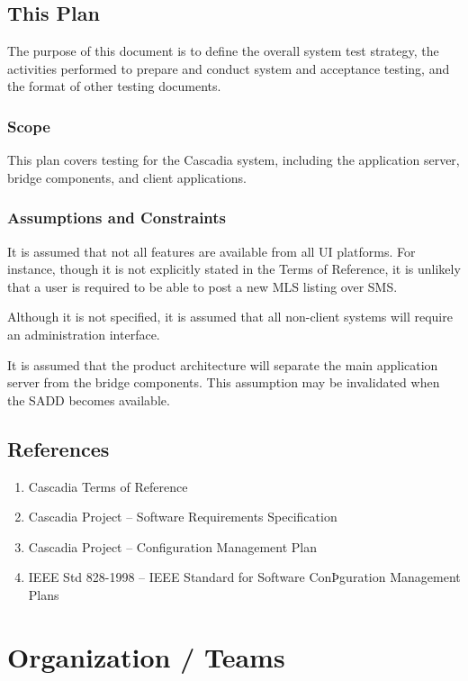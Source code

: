 \documentclass[11pt]{wacomepd}
\begin{document}
\section{This Plan}
The purpose of this document is to define the overall system test strategy, the activities performed
to prepare and conduct system and acceptance testing, and the format of other testing documents.

\subsection{Scope}
This plan covers testing for the Cascadia system, including the application server, bridge
components, and client applications.

\subsection{Assumptions and Constraints}
It is assumed that not all features are available from all UI platforms.  For instance, though it is
not explicitly stated in the Terms of Reference, it is unlikely that a user is required to be able
to post a new MLS listing over SMS.

Although it is not specified, it is assumed that all non-client systems will require an
administration interface.

It is assumed that the product architecture will separate the main application server from the
bridge components.  This assumption may be invalidated when the SADD becomes available.


\section{References}
\begin{enumerate}[(1)]
\item Cascadia Terms of Reference
\item Cascadia Project -- Software Requirements Specification
\item Cascadia Project -- Configuration Management Plan
\item IEEE Std 828-1998 -- IEEE Standard for Software ConÞguration Management Plans
\end{enumerate}


\chapter{Organization / Teams}
\end{document}
